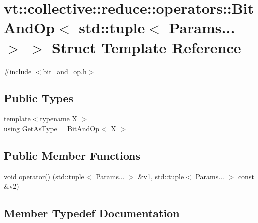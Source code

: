 \hypertarget{structvt_1_1collective_1_1reduce_1_1operators_1_1_bit_and_op_3_01std_1_1tuple_3_01_params_8_8_8_01_4_01_4}{}\section{vt\+:\+:collective\+:\+:reduce\+:\+:operators\+:\+:Bit\+And\+Op$<$ std\+:\+:tuple$<$ Params... $>$ $>$ Struct Template Reference}
\label{structvt_1_1collective_1_1reduce_1_1operators_1_1_bit_and_op_3_01std_1_1tuple_3_01_params_8_8_8_01_4_01_4}


{\ttfamily \#include $<$bit\+\_\+and\+\_\+op.\+h$>$}

\subsection*{Public Types}
\begin{DoxyCompactItemize}
\item 
{\footnotesize template$<$typename X $>$ }\\using \hyperlink{structvt_1_1collective_1_1reduce_1_1operators_1_1_bit_and_op_3_01std_1_1tuple_3_01_params_8_8_8_01_4_01_4_afe2bd7f43c3c31f12596650daadd6cc9}{Get\+As\+Type} = \hyperlink{structvt_1_1collective_1_1reduce_1_1operators_1_1_bit_and_op}{Bit\+And\+Op}$<$ X $>$
\end{DoxyCompactItemize}
\subsection*{Public Member Functions}
\begin{DoxyCompactItemize}
\item 
void \hyperlink{structvt_1_1collective_1_1reduce_1_1operators_1_1_bit_and_op_3_01std_1_1tuple_3_01_params_8_8_8_01_4_01_4_a0ba9be3f1a6dff2256f2fa9ba94ba1cb}{operator()} (std\+::tuple$<$ Params... $>$ \&v1, std\+::tuple$<$ Params... $>$ const \&v2)
\end{DoxyCompactItemize}


\subsection{Member Typedef Documentation}
\mbox{\label{structvt_1_1collective_1_1reduce_1_1operators_1_1_bit_and_op_3_01std_1_1tuple_3_01_params_8_8_8_01_4_01_4_afe2bd7f43c3c31f12596650daadd6cc9}} 
